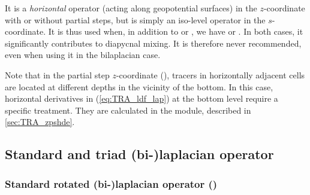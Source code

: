 \documentclass[../main/NEMO_manual]{subfiles}
\begin{document}
It is a \textit{horizontal} operator (\ie acting along geopotential surfaces) in
the $z$-coordinate with or without partial steps,
but is simply an iso-level operator in the $s$-coordinate.
It is thus used when,
in addition to  or ,
we have  or
.
In both cases, it significantly contributes to diapycnal mixing.
It is therefore never recommended, even when using it in the bilaplacian case.

Note that in the partial step $z$-coordinate (),
tracers in horizontally adjacent cells are located at different depths in the vicinity of the bottom.
In this case,
horizontal derivatives in (\autoref{eq:TRA_ldf_lap}) at the bottom level require a specific treatment.
They are calculated in the  module, described in \autoref{sec:TRA_zpshde}.

\subsection{Standard and triad (bi-)laplacian operator}
\label{subsec:TRA_ldf_iso_triad}

\subsubsection[Standard rotated (bi-)laplacian operator (\textit{traldf\_iso.F90})]{Standard rotated (bi-)laplacian operator (\protect{})}
\label{subsec:TRA_ldf_iso}
\end{document}
